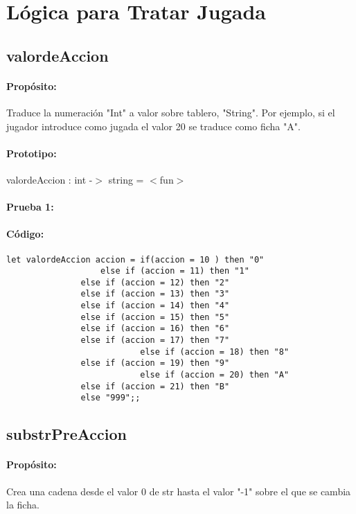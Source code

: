 \section{Lógica para Tratar Jugada}

\subsection{valordeAccion}

\paragraph{Propósito:} Traduce la numeración "Int" a valor sobre tablero, "String". Por
ejemplo, si el jugador introduce como jugada el valor 20 se traduce como ficha
"A".
\paragraph{Prototipo:} valordeAccion : int -$>$ string = $<$fun$>$
\paragraph{Prueba 1:}
\paragraph{Código:}
\begin{verbatim}
let valordeAccion accion = if(accion = 10 ) then "0" 
		           else if (accion = 11) then "1" 
			   else if (accion = 12) then "2"
			   else if (accion = 13) then "3" 
			   else if (accion = 14) then "4" 
			   else if (accion = 15) then "5" 
			   else if (accion = 16) then "6" 
			   else if (accion = 17) then "7" 
                           else if (accion = 18) then "8" 
			   else if (accion = 19) then "9" 
                           else if (accion = 20) then "A" 
			   else if (accion = 21) then "B" 
			   else "999";;

\end{verbatim}

\subsection{substrPreAccion}

\paragraph{Propósito:} Crea una cadena desde el valor 0 de str hasta el valor "-1" sobre el
que se cambia la ficha.
